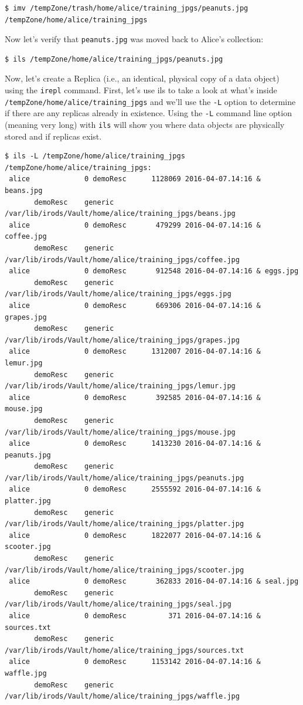 \documentclass[10pt,oneside]{memoir}
\begin{document}
\begin{lstlisting}[basicstyle=\tiny\ttfamily]
$ imv /tempZone/trash/home/alice/training_jpgs/peanuts.jpg /tempZone/home/alice/training_jpgs
\end{lstlisting}

Now let's verify that \texttt{peanuts.jpg} was moved back to Alice's collection:

\begin{lstlisting}
$ ils /tempZone/home/alice/training_jpgs/peanuts.jpg
\end{lstlisting}

\newpage

Now, let's create a Replica (i.e., an identical, physical copy of a data object) using the \texttt{irepl} command. First, let's use ils to take a look at what's inside \texttt{/tempZone/home/alice/training\_jpgs} and we'll use the \texttt{-L} option to determine if there are any replicas already in existence. Using the \texttt{-L} command line option (meaning very long) with \texttt{ils} will show you where data objects are physically stored and if replicas exist.

\begin{lstlisting}[basicstyle=\tiny]
$ ils -L /tempZone/home/alice/training_jpgs
/tempZone/home/alice/training_jpgs:
 alice             0 demoResc      1128069 2016-04-07.14:16 & beans.jpg
       demoResc    generic    /var/lib/irods/Vault/home/alice/training_jpgs/beans.jpg
 alice             0 demoResc       479299 2016-04-07.14:16 & coffee.jpg
       demoResc    generic    /var/lib/irods/Vault/home/alice/training_jpgs/coffee.jpg
 alice             0 demoResc       912548 2016-04-07.14:16 & eggs.jpg
       demoResc    generic    /var/lib/irods/Vault/home/alice/training_jpgs/eggs.jpg
 alice             0 demoResc       669306 2016-04-07.14:16 & grapes.jpg
       demoResc    generic    /var/lib/irods/Vault/home/alice/training_jpgs/grapes.jpg
 alice             0 demoResc      1312007 2016-04-07.14:16 & lemur.jpg
       demoResc    generic    /var/lib/irods/Vault/home/alice/training_jpgs/lemur.jpg
 alice             0 demoResc       392585 2016-04-07.14:16 & mouse.jpg
       demoResc    generic    /var/lib/irods/Vault/home/alice/training_jpgs/mouse.jpg
 alice             0 demoResc      1413230 2016-04-07.14:16 & peanuts.jpg
       demoResc    generic    /var/lib/irods/Vault/home/alice/training_jpgs/peanuts.jpg
 alice             0 demoResc      2555592 2016-04-07.14:16 & platter.jpg
       demoResc    generic    /var/lib/irods/Vault/home/alice/training_jpgs/platter.jpg
 alice             0 demoResc      1822077 2016-04-07.14:16 & scooter.jpg
       demoResc    generic    /var/lib/irods/Vault/home/alice/training_jpgs/scooter.jpg
 alice             0 demoResc       362833 2016-04-07.14:16 & seal.jpg
       demoResc    generic    /var/lib/irods/Vault/home/alice/training_jpgs/seal.jpg
 alice             0 demoResc          371 2016-04-07.14:16 & sources.txt
       demoResc    generic    /var/lib/irods/Vault/home/alice/training_jpgs/sources.txt
 alice             0 demoResc      1153142 2016-04-07.14:16 & waffle.jpg
       demoResc    generic    /var/lib/irods/Vault/home/alice/training_jpgs/waffle.jpg
\end{lstlisting}
\end{document}
